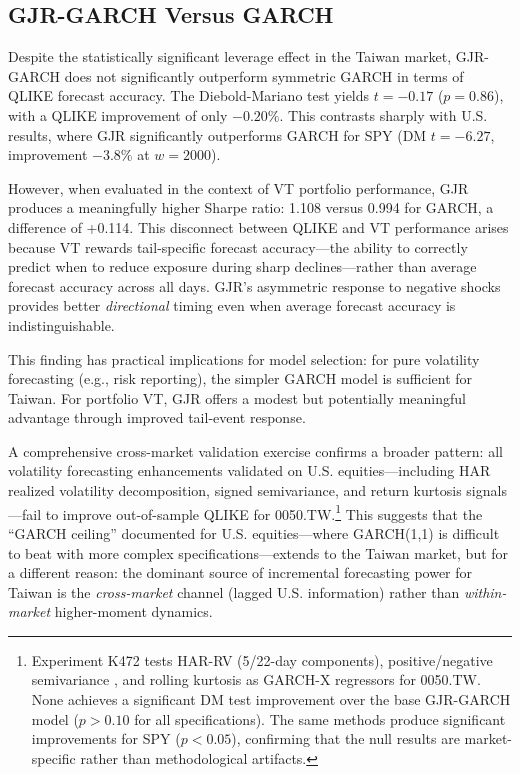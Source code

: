 \subsection{GJR-GARCH Versus GARCH}

Despite the statistically significant leverage effect in the Taiwan market, GJR-GARCH does not significantly outperform symmetric GARCH in terms of QLIKE forecast accuracy. The Diebold-Mariano test yields $t = -0.17$ ($p = 0.86$), with a QLIKE improvement of only $-0.20\%$. This contrasts sharply with U.S. results, where GJR significantly outperforms GARCH for SPY (DM $t = -6.27$, improvement $-3.8\%$ at $w = 2000$).

However, when evaluated in the context of VT portfolio performance, GJR produces a meaningfully higher Sharpe ratio: 1.108 versus 0.994 for GARCH, a difference of +0.114. This disconnect between QLIKE and VT performance arises because VT rewards tail-specific forecast accuracy---the ability to correctly predict when to reduce exposure during sharp declines---rather than average forecast accuracy across all days. GJR's asymmetric response to negative shocks provides better \textit{directional} timing even when average forecast accuracy is indistinguishable.

This finding has practical implications for model selection: for pure volatility forecasting (e.g., risk reporting), the simpler GARCH model is sufficient for Taiwan. For portfolio VT, GJR offers a modest but potentially meaningful advantage through improved tail-event response.

A comprehensive cross-market validation exercise confirms a broader pattern: all volatility forecasting enhancements validated on U.S. equities---including HAR realized volatility decomposition, signed semivariance, and return kurtosis signals---fail to improve out-of-sample QLIKE for 0050.TW.\footnote{Experiment K472 tests HAR-RV \citep{corsi2009} (5/22-day components), positive/negative semivariance \citep{barndorff2010}, and rolling kurtosis as GARCH-X regressors for 0050.TW. None achieves a significant DM test improvement over the base GJR-GARCH model ($p > 0.10$ for all specifications). The same methods produce significant improvements for SPY ($p < 0.05$), confirming that the null results are market-specific rather than methodological artifacts.} This suggests that the ``GARCH ceiling'' documented for U.S. equities---where GARCH(1,1) is difficult to beat with more complex specifications---extends to the Taiwan market, but for a different reason: the dominant source of incremental forecasting power for Taiwan is the \textit{cross-market} channel (lagged U.S. information) rather than \textit{within-market} higher-moment dynamics.

